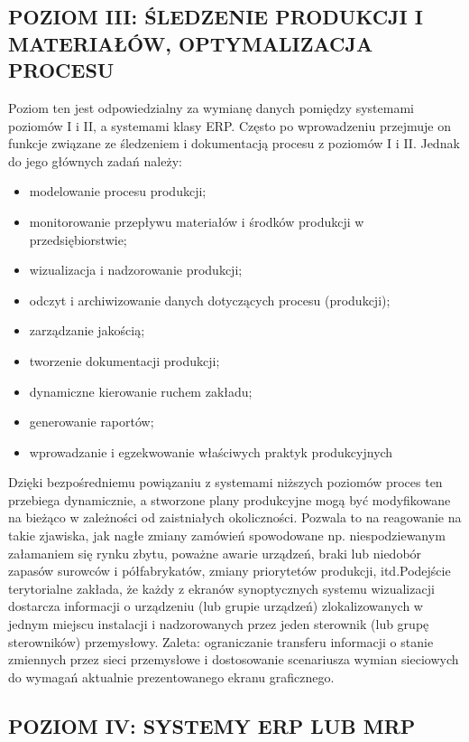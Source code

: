 \documentclass{article}
\begin{document}
    	\subsection{POZIOM III: ŚLEDZENIE PRODUKCJI I MATERIAŁÓW, OPTYMALIZACJA PROCESU}
	Poziom ten jest odpowiedzialny za wymianę danych pomiędzy systemami poziomów I i II, a
	systemami klasy ERP. Często po wprowadzeniu przejmuje on funkcje związane ze śledzeniem i
	dokumentacją procesu z poziomów I i II. Jednak do jego głównych zadań należy:
	\begin{itemize}
        \item modelowanie procesu produkcji;
        \item monitorowanie przepływu materiałów i środków produkcji w przedsiębiorstwie;
        \item wizualizacja i nadzorowanie produkcji;
        \item odczyt i archiwizowanie danych dotyczących procesu (produkcji);
        \item zarządzanie jakością;
        \item tworzenie dokumentacji produkcji;
        \item dynamiczne kierowanie ruchem zakładu;
        \item generowanie raportów;
        \item wprowadzanie i egzekwowanie właściwych praktyk produkcyjnych 
    	\end{itemize}
    Dzięki bezpośredniemu powiązaniu z systemami niższych poziomów proces ten przebiega dynamicznie, a
    stworzone plany produkcyjne mogą być modyfikowane na bieżąco w zależności od zaistniałych okoliczności.
    Pozwala to na reagowanie na takie zjawiska, jak nagłe zmiany zamówień spowodowane np. niespodziewanym
    załamaniem się rynku zbytu, poważne awarie urządzeń, braki lub niedobór zapasów surowców i półfabrykatów,
    zmiany priorytetów produkcji, itd.Podejście terytorialne zakłada, że każdy z ekranów
    synoptycznych systemu wizualizacji dostarcza informacji o
    urządzeniu (lub grupie urządzeń) zlokalizowanych w jednym miejscu
    instalacji i nadzorowanych przez jeden sterownik (lub grupę
    sterowników) przemysłowy.
    Zaleta: ograniczanie transferu informacji o stanie zmiennych przez
    sieci przemysłowe i dostosowanie scenariusza wymian sieciowych do
    wymagań aktualnie prezentowanego ekranu graficznego.
    
       \subsection{POZIOM IV: SYSTEMY ERP LUB MRP}
       	
\end{document}
